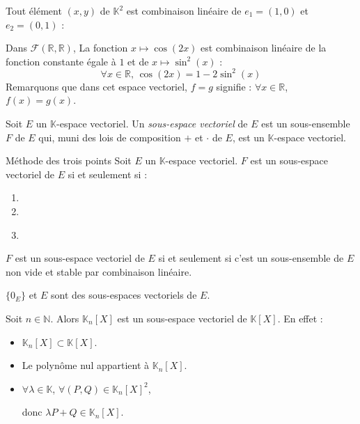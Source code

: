 \documentclass[a4paper,10pt]{report}
\begin{document}
\newpage

\begin{exems}
\item Tout élément $(x,y)$ de $\mathbb{K}^2$ est combinaison linéaire de $e_1=(1,0)$ et $e_2=(0,1)$ :

\phantom{$(x,y) = x(1,0)+ y(0,1)= xe_1 + y e_2$}
\item Dans $\mathcal{F}(\mathbb{R},\mathbb{R})$, La fonction $x \mapsto \cos(2x)$ est combinaison linéaire de la fonction constante égale à $1$ et de $x \mapsto \sin^2(x)$ :
$$ \forall x \in \mathbb{R}, \, \cos(2x) = 1 - 2 \sin^2(x)$$
Remarquons que dans cet espace vectoriel, $f=g$ signifie : $\forall x \in \mathbb{R}$, $f(x)=g(x)$.
\end{exems}



\begin{Definition}{} Soit $E$ un $\mathbb{K}$-espace vectoriel. Un \emph{sous-espace vectoriel} de $E$ est un sous-ensemble $F$ de $E$ qui, muni  des lois de composition $+$ et $\cdot$ de $E$, est un $\mathbb{K}$-espace vectoriel.
\end{Definition}

\begin{Proposition}{Méthode des trois points}
Soit $E$ un $\mathbb{K}$-espace vectoriel. $F$ est un sous-espace vectoriel de $E$ si et seulement si :
\begin{enumerate}
\item \phantom{$F \subset E$.}
\item {}
\item {}

$\phantom{jj}$
\end{enumerate}
\end{Proposition}

\begin{Remarque}{}
$F$ est un sous-espace vectoriel de $E$ si et seulement si c'est un sous-ensemble de $E$ non vide et stable par combinaison linéaire.
\end{Remarque}

\begin{exems}
\item $\lbrace 0_E \rbrace$ et $E$ sont des sous-espaces vectoriels de $E$.
\item Soit $n \in \mathbb{N}$. Alors $\mathbb{K}_n[X]$ est un sous-espace vectoriel de $\mathbb{K}[X]$. En effet :
\begin{itemize}
\item $\mathbb{K}_n[X] \subset \mathbb{K}[X]$.
\item Le polynôme nul appartient à $\mathbb{K}_n[X]$.
\item $\forall \lambda \in \mathbb{K}$, $\forall (P,Q) \in \mathbb{K}_n[X]^2$,

\vspace{1cm}

donc $\lambda P + Q \in \mathbb{K}_n[X]$.
\end{itemize}
\end{exems}
\end{document}
